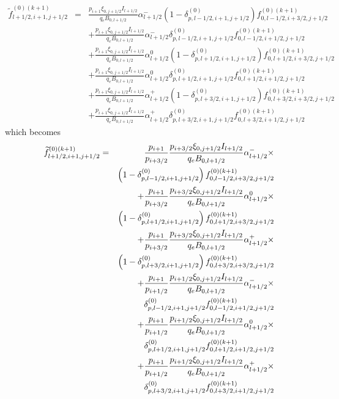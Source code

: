 \begin{eqnarray}
\widetilde{f}_{l+1/2,i+1,j+1/2}^{\left( 0\right) (k+1)} &=&\frac{p_{i+1}\xi
_{0,j+1/2}I_{l+1/2}}{q_{e}B_{0,l+1/2}}\alpha _{l+1/2}^{-}\left( 1-\delta
_{p,l-1/2,i+1,j+1/2}^{(0)}\right) f_{0,l-1/2,i+3/2,j+1/2}^{(0)(k+1)}
\nonumber \\
&&+\frac{p_{i+1}\xi _{0,j+1/2}I_{l+1/2}}{q_{e}B_{0,l+1/2}}\alpha
_{l+1/2}^{-}\delta
_{p,l-1/2,i+1,j+1/2}^{(0)}f_{0,l-1/2,i+1/2,j+1/2}^{(0)(k+1)}  \nonumber \\
&&+\frac{p_{i+1}\xi _{0,j+1/2}I_{l+1/2}}{q_{e}B_{0,l+1/2}}\alpha
_{l+1/2}^{0}\left( 1-\delta _{p,l+1/2,i+1,j+1/2}^{(0)}\right)
f_{0,l+1/2,i+3/2,j+1/2}^{(0)(k+1)}  \nonumber \\
&&+\frac{p_{i+1}\xi _{0,j+1/2}I_{l+1/2}}{q_{e}B_{0,l+1/2}}\alpha
_{l+1/2}^{0}\delta
_{p,l+1/2,i+1,j+1/2}^{(0)}f_{0,l+1/2,i+1/2,j+1/2}^{(0)(k+1)}  \nonumber \\
&&+\frac{p_{i+1}\xi _{0,j+1/2}I_{l+1/2}}{q_{e}B_{0,l+1/2}}\alpha
_{l+1/2}^{+}\left( 1-\delta _{p,l+3/2,i+1,j+1/2}^{(0)}\right)
f_{0,l+3/2,i+3/2,j+1/2}^{(0)(k+1)}  \nonumber \\
&&+\frac{p_{i+1}\xi _{0,j+1/2}I_{l+1/2}}{q_{e}B_{0,l+1/2}}\alpha
_{l+1/2}^{+}\delta
_{p,l+3/2,i+1,j+1/2}^{(0)}f_{0,l+3/2,i+1/2,j+1/2}^{(0)(k+1)}
\end{eqnarray}
which becomes
\begin{eqnarray}
\widetilde{f}_{l+1/2,i+1,j+1/2}^{\left( 0\right) (k+1)} &=&\frac{p_{i+1}}{%
p_{i+3/2}}\frac{p_{i+3/2}\xi _{0,j+1/2}I_{l+1/2}}{q_{e}B_{0,l+1/2}}\alpha
_{l+1/2}^{-}\times   \nonumber \\
&&\left( 1-\delta _{p,l-1/2,i+1,j+1/2}^{(0)}\right)
f_{0,l-1/2,i+3/2,j+1/2}^{(0)(k+1)}  \nonumber \\
&&+\frac{p_{i+1}}{p_{i+3/2}}\frac{p_{i+3/2}\xi _{0,j+1/2}I_{l+1/2}}{%
q_{e}B_{0,l+1/2}}\alpha _{l+1/2}^{0}\times   \nonumber \\
&&\left( 1-\delta _{p,l+1/2,i+1,j+1/2}^{(0)}\right)
f_{0,l+1/2,i+3/2,j+1/2}^{(0)(k+1)}  \nonumber \\
&&+\frac{p_{i+1}}{p_{i+3/2}}\frac{p_{i+3/2}\xi _{0,j+1/2}I_{l+1/2}}{%
q_{e}B_{0,l+1/2}}\alpha _{l+1/2}^{+}\times   \nonumber \\
&&\left( 1-\delta _{p,l+3/2,i+1,j+1/2}^{(0)}\right)
f_{0,l+3/2,i+3/2,j+1/2}^{(0)(k+1)}  \nonumber \\
&&+\frac{p_{i+1}}{p_{i+1/2}}\frac{p_{i+1/2}\xi _{0,j+1/2}I_{l+1/2}}{%
q_{e}B_{0,l+1/2}}\alpha _{l+1/2}^{-}\times   \nonumber \\
&&\delta _{p,l-1/2,i+1,j+1/2}^{(0)}f_{0,l-1/2,i+1/2,j+1/2}^{(0)(k+1)}
\nonumber \\
&&+\frac{p_{i+1}}{p_{i+1/2}}\frac{p_{i+1/2}\xi _{0,j+1/2}I_{l+1/2}}{%
q_{e}B_{0,l+1/2}}\alpha _{l+1/2}^{0}\times   \nonumber \\
&&\delta _{p,l+1/2,i+1,j+1/2}^{(0)}f_{0,l+1/2,i+1/2,j+1/2}^{(0)(k+1)}
\nonumber \\
&&+\frac{p_{i+1}}{p_{i+1/2}}\frac{p_{i+1/2}\xi _{0,j+1/2}I_{l+1/2}}{%
q_{e}B_{0,l+1/2}}\alpha _{l+1/2}^{+}\times   \nonumber \\
&&\delta _{p,l+3/2,i+1,j+1/2}^{(0)}f_{0,l+3/2,i+1/2,j+1/2}^{(0)(k+1)}
\end{eqnarray}
